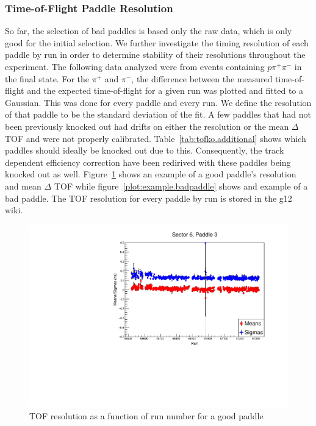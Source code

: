\begin{v2}
\subsubsection{\label{sec:calib.tof.resolution}Time-of-Flight Paddle Resolution}
So far, the selection of bad paddles is based only the raw data, which is only good for the initial selection. We further investigate the timing resolution of each paddle by run in order to determine stability of their resolutions throughout the experiment. The following data analyzed were from events containing $p \pi^{+} \pi^{-}$ in the final state. For the $\pi^{+}$ and $\pi^{-}$, the difference between the measured time-of-flight and the expected time-of-flight for a given run was plotted and fitted to a Gaussian. This was done for every paddle and every run. We define the resolution of that paddle to be the standard deviation of the fit.
A few paddles that had not been previously knocked out had drifts on either the resolution or the mean $\Delta$ TOF and were not properly calibrated. Table~\ref{tab:tofko.additional} shows which paddles should ideally be knocked out due to this.  Consequently, the track dependent efficiency correction have been redirived with these paddles being knocked out as well.  Figure~\ref{plot:example.goodpaddle} shows an example of a good paddle's resolution and mean $\Delta$ TOF while figure~\ref{plot:example.badpaddle} shows and example of a bad paddle. The TOF resolution for every paddle by run is stored in the g12 wiki. 


 



\begin{figure}\begin{center}
      \includegraphics[width=0.4\columnwidth,angle=270]{figures/calib/tof/goodexample.pdf}
   \caption{\label{plot:example.goodpaddle}TOF resolution as a function of run number for a good paddle}
\end{center}\end{figure}


\end{v2}
